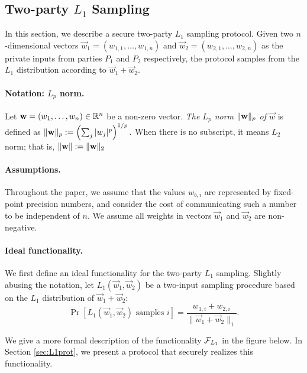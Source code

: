\subsection{Two-party $L_1$ Sampling}\label{sec:l1}
In this section, we describe a secure two-party $L_1$ sampling protocol.
Given two $n$-dimensional vectors $\vec{w}_1 = (w_{1,1}, \ldots,
w_{1,n})$ and $\vec{w}_2 = (w_{2,1}, \ldots, w_{2,n})$ as the private
inputs from parties $P_1$ and $P_2$ respectively, the protocol samples from the $L_1$ distribution according to
$\vec{w}_1 + \vec{w}_2$.  

\paragraph{Notation: $L_p$ norm.}
Let $\mathbf{w} = (w_1, \ldots, w_n) \in \mathbb{R}^n$ be a non-zero vector. \emph{The $L_p$
norm $\Vert \mathbf{w} \Vert_p$ of $\vec{w}$} is defined as
$\Vert \mathbf{w} \Vert_p := \left ( \sum_j |w_j|^p \right )^{1/p} .$
When there is no subscript, it means $L_2$ norm; that is, $\Vert \mathbf{w} \Vert := \Vert \mathbf{w} \Vert_2$  

\paragraph{Assumptions.}
Throughout the paper, we assume that the values $w_{b,i}$ are
represented by fixed-point precision numbers, and consider the cost of
communicating such a number to be independent of $n$.
%
We assume all weights in vectors $\vec{w}_1$ and $\vec{w}_2$ are
non-negative.

\paragraph{Ideal functionality.}
We first define an ideal functionality for the two-party $L_1$ sampling.
Slightly abusing the notation, let $L_1(\vec{w}_1, \vec{w}_2)$ be a
two-input sampling procedure based on the $L_1$ distribution of $\vec{w}_1 +
\vec{w}_2$: 
%
$$\Pr[ L_1(\vec{w}_1, \vec{w}_2) \mbox{ samples } i ] = \frac{w_{1,i} +
w_{2,i}}{ \|\vec{w}_1 + \vec{w}_2\|_1 }. $$


We give a more formal description of the functionality $\mathcal{F}_{L_1}$ in the
figure below.  In Section \ref{sec:L1prot}, we present a protocol that
securely realizes this functionality. 


